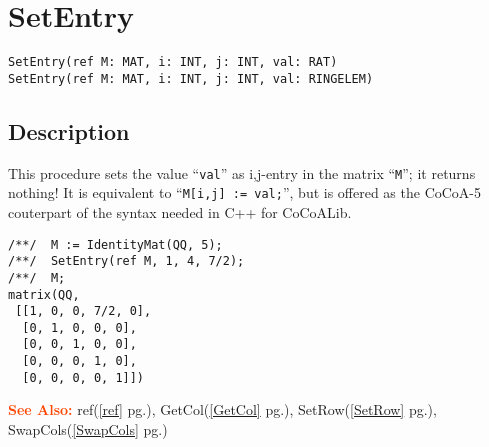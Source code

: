\documentclass[a4paper]{mybook}
\newenvironment{command}{}{} %
\newcommand\SeeAlso{\par\textcolor{OrangeRed}{\textbf{\large See Also: }}}
\begin{document}
\section{SetEntry}
\label{SetEntry}
\begin{command} %


\begin{Verbatim}[label=syntax, rulecolor=\color{MidnightBlue},
frame=single]
SetEntry(ref M: MAT, i: INT, j: INT, val: RAT)
SetEntry(ref M: MAT, i: INT, j: INT, val: RINGELEM)
\end{Verbatim}


\subsection*{Description}

This procedure sets the value ``\verb&val&'' as i,j-entry in the matrix ``\verb&M&'';
it returns nothing!
It is equivalent to ``\verb&M[i,j] := val;&'', but is offered as the
CoCoA-5 couterpart of the syntax needed in C++ for CoCoALib.
\begin{Verbatim}[label=example, rulecolor=\color{PineGreen}, frame=single]
/**/  M := IdentityMat(QQ, 5);
/**/  SetEntry(ref M, 1, 4, 7/2);
/**/  M;
matrix(QQ,
 [[1, 0, 0, 7/2, 0],
  [0, 1, 0, 0, 0],
  [0, 0, 1, 0, 0],
  [0, 0, 0, 1, 0],
  [0, 0, 0, 0, 1]])
\end{Verbatim}


\SeeAlso %
  ref(\ref{ref} pg.\pageref{ref}), 
    GetCol(\ref{GetCol} pg.\pageref{GetCol}), 
    SetRow(\ref{SetRow} pg.\pageref{SetRow}), 
    SwapCols(\ref{SwapCols} pg.\pageref{SwapCols})
\end{command} %
\end{document}
